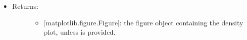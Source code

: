\documentclass[letterpaper,10pt,english]{sphinxmanual}
\begin{document}
\begin{fulllineitems}
\begin{itemize}
\item {} \begin{description}
\item[{Returns:}] \leavevmode\begin{itemize}
\item {} 
{[}matplotlib.figure.Figure{]}: the figure object containing the
density plot, unless  is provided.

\end{itemize}

\end{description}

\end{itemize}

\end{fulllineitems}

\end{document}
